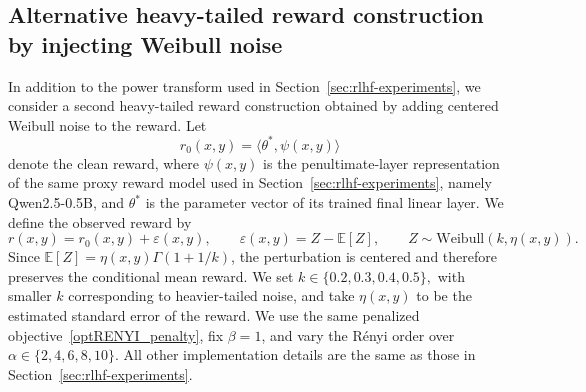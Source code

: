 \documentclass[11pt]{article}
\begin{document}
\subsection{Alternative heavy-tailed reward construction by injecting Weibull noise}\label{app:weibull-noise}
 

In addition to the power transform used in Section~\ref{sec:rlhf-experiments}, we consider a second heavy-tailed reward construction obtained by adding centered Weibull noise to the reward. Let
\[
r_0(x,y)=\langle \theta^{*},\psi(x,y)\rangle
\]
denote the clean reward, where $\psi(x,y)$ is the penultimate-layer representation of the same proxy reward model used in Section~\ref{sec:rlhf-experiments}, namely Qwen2.5-0.5B, and $\theta^{*}$ is the parameter vector of its trained final linear layer. We define the observed reward by
\[
r(x,y)=r_0(x,y)+\varepsilon(x,y),
\qquad
\varepsilon(x,y)=Z-\mathbb{E}[Z],
\qquad
Z\sim \mathrm{Weibull}(k,\eta(x,y)).
\]
Since $\mathbb{E}[Z]=\eta(x,y)\Gamma(1+1/k)$, the perturbation is centered and therefore preserves the conditional mean reward. We set
\(
k\in\{0.2,0.3,0.4,0.5\},
\)
with smaller $k$ corresponding to heavier-tailed noise, and take $\eta(x,y)$ to be the estimated standard error of the reward. We use the same penalized objective~\eqref{optRENYI_penalty}, fix $\beta=1$, and vary the R\'enyi order over
\(
\alpha\in\{2,4,6,8,10\}.
\)
All other implementation details are the same as those in Section~\ref{sec:rlhf-experiments}.
\end{document}
